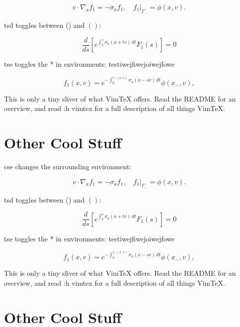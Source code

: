 \documentclass{article}
\begin{document}
\begin{equation}
  v \cdot \nabla_x f_1 = -\sigma_a f_1, \quad f_1 \rvert_{\Gamma_-} = \phi(x,v).
\end{equation}

tsd toggles between () and \( \left( \right) \):

\begin{equation*}
  \frac{d}{ds} \left[ e^{\int_k^s \sigma_a(x + tv)\,dt} F_1(s) \right] = 0
\end{equation*}

tse toggles the * in environments:
testiwejfiwejoiwejfowe

\begin{equation}
  f_1(x, v) = e^{-\int_0^{\tau_-(x, v)} \sigma_a(x - sv)\,dt} \phi(x_-, v),
\end{equation}

This is only a tiny sliver of what VimTeX offers.
Read the README for an overview, and read :h vimtex for a full description of
all things VimTeX.




\section{Other Cool Stuff}

cse changes the surrounding environment:

\begin{equation}
  v \cdot \nabla_x f_1 = -\sigma_a f_1, \quad f_1 \rvert_{\Gamma_-} = \phi(x,v).
\end{equation}

tsd toggles between () and \( \left( \right) \):

\begin{equation*}
  \frac{d}{ds} \left[ e^{\int_k^s \sigma_a(x + tv)\,dt} F_1(s) \right] = 0
\end{equation*}

tse toggles the * in environments:
testiwejfiwejoiwejfowe

\begin{equation}
  f_1(x, v) = e^{-\int_0^{\tau_-(x, v)} \sigma_a(x - sv)\,dt} \phi(x_-, v),
\end{equation}

This is only a tiny sliver of what VimTeX offers.
Read the README for an overview, and read :h vimtex for a full description of
all things VimTeX.




\section{Other Cool Stuff}
\end{document}
